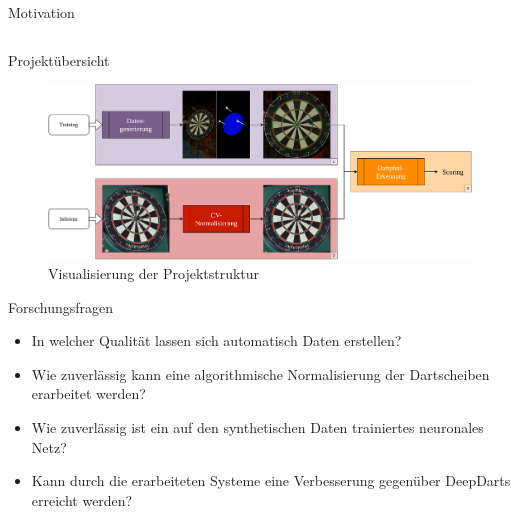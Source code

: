 \begin{frame}{Motivation}
\begin{columns}
\begin{column}{0.4\linewidth}
        \end{column}
    \end{columns}

    \vspace*{-0.2cm}


\end{frame}

\begin{frame}{Projektübersicht}
    \begin{figure}
        \centering
        \includegraphics[width=\linewidth]{imgs/ma_project_structure.pdf}
        \caption{Visualisierung der Projektstruktur}
    \end{figure}
\end{frame}

\begin{frame}{Forschungsfragen}
    \begin{itemize}
        \item<2-> In welcher Qualität lassen sich automatisch Daten erstellen?
        \item<3-> Wie zuverlässig kann eine algorithmische Normalisierung der Dartscheiben erarbeitet werden?
        \item<4-> Wie zuverlässig ist ein auf den synthetischen Daten trainiertes neuronales Netz?
        \item<5-> Kann durch die erarbeiteten Systeme eine Verbesserung gegenüber DeepDarts erreicht werden?
    \end{itemize}
\end{frame}